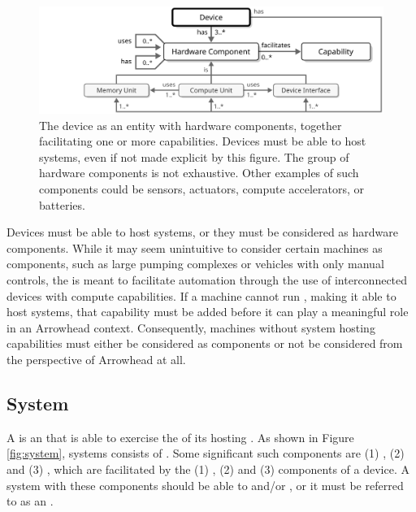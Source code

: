 \begin{figure}[ht!]
  \centering
  \includegraphics[scale=0.9]{figures/device}
  \caption{
    The device as an entity with hardware components, together facilitating one or more capabilities.
    Devices must be able to host systems, even if not made explicit by this figure.
    The group of hardware components is not exhaustive.
    Other examples of such components could be sensors, actuators, compute accelerators, or batteries.
  }
  \label{fig:device}
\end{figure}

\vspace*{1.8mm}

Devices must be able to host systems, or they must be considered as hardware components.
While it may seem unintuitive to consider certain machines as components, such as large pumping complexes or vehicles with only manual controls, the  is meant to facilitate automation through the use of interconnected devices with compute capabilities.
If a machine cannot run , making it able to host systems, that capability must be added before it can play a meaningful role in an Arrowhead context.
Consequently, machines without system hosting capabilities must either be considered as components or not be considered from the perspective of Arrowhead at all.

\subsection{System}
\label{sec:concepts:system}

A  is an   that is able to exercise the  of its hosting .
As shown in Figure \ref{fig:system}, systems consists of .
Some significant such components are (1) , (2)  and (3) , which are facilitated by the (1) , (2)  and (3)  components of a device.
A system with these components should be able to  and/or  , or it must be referred to as an .


